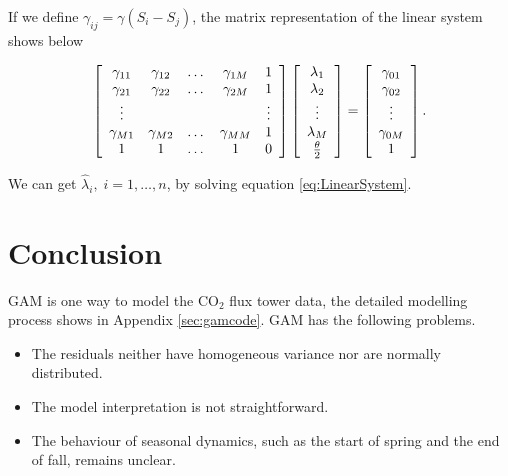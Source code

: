 \documentclass{article}\usepackage[]{graphicx}\usepackage[]{color}
\begin{document}
If we define $\gamma_{ij}=\gamma(S_i-S_j)$, the matrix representation of the linear system  shows below

\begin{equation}\label{eq:LinearSystem}
\left[\begin{array}{*{20}c}
\gamma_{11} & \gamma_{12} & \dots & \gamma_{1M} & 1\\
\gamma_{21} & \gamma_{22} & \dots & \gamma_{2M} & 1\\
\vdots    & & & & \vdots\\
\gamma_{M1} & \gamma_{M2} & \dots & \gamma_{MM} & 1\\
1 & 1 & \dots & 1 & 0\\
\end{array}\right]  \left[\begin{array}{*{20}c}
\lambda_{1}\\
\lambda_{2}\\
\vdots\\
\lambda_{M}\\
\frac{\theta}{2}\\
\end{array}\right]=\left[\begin{array}{*{20}c}
\gamma_{01}\\
\gamma_{02}\\
\vdots\\
\gamma_{0M}\\
1\\
\end{array}\right].
\end{equation}

We can get $\widehat{\lambda}_i,\;i=1,\dots,n$, by solving equation \ref{eq:LinearSystem}.

\section{Conclusion}\label{Sec:Conclusion}

GAM is one way to model the CO$_2$ flux tower data, the detailed modelling process shows in Appendix \ref{sec:gamcode}. GAM has the following problems.

\begin{itemize}
\item The residuals neither have homogeneous variance nor are normally distributed.
\item The model interpretation is not straightforward.
\item The behaviour of seasonal dynamics, such as the start of spring and the end of fall, remains unclear. 
\end{itemize}
\end{document}
